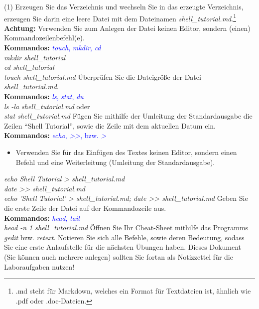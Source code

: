 \documentclass[paper=a4,fontsize=11pt]{scrartcl}%
\numberwithin{equation}{section}
\begin{document}
\begin{enumerate}
        \begin{tasks}(1)
        \task Erzeugen Sie das Verzeichnis  und wechseln Sie in das erzeugte Verzeichnis, erzeugen Sie darin eine leere Datei mit dem Dateinamen \textit{shell\_tutorial.md}.\footnote{.md steht für Markdown, welches ein Format für Textdateien ist, ähnlich wie .pdf oder .doc-Dateien.} \\
        \textbf{Achtung:} Verwenden Sie zum Anlegen der Datei keinen Editor, sondern (einen) Kommandozeilenbefehl(e).\\
        \textbf{Kommandos:} \textcolor{blue}{\emph{touch}, \emph{mkdir}, \emph{cd}}\\
		\textit{mkdir shell\_tutorial}\\
		\textit{cd shell\_tutorial}\\
		\textit{touch shell\_tutorial.md}
		\task Überprüfen Sie die Dateigröße der Datei \textit{shell\_tutorial.md}.\\
		\textbf{Kommandos:} \textcolor{blue}{\emph{ls}, \emph{stat}, \emph{du}}\\
		\textit{ls -la shell\_tutorial.md} oder\\
		\textit{stat shell\_tutorial.md}
		\task Fügen Sie mithilfe der Umleitung der Standardausgabe die Zeilen  \enquote{Shell Tutorial}, sowie die Zeile mit dem aktuellen Datum ein.\\
		\textbf{Kommandos:} \textcolor{blue}{\emph{echo}, \emph{>>}, bzw. \emph{>}}\\
		\begin{itemize}
			\item \small Verwenden Sie für das Einfügen des Textes keinen Editor, sondern einen Befehl und eine Weiterleitung (Umleitung der Standardausgabe).
		\end{itemize}
		\textit{echo Shell Tutorial > shell\_tutorial.md}\\
		\textit{date >> shell\_tutorial.md}\\
		\textit{echo 'Shell Tutorial' > shell\_tutorial.md; date >> shell\_tutorial.md}
		\task Geben Sie die erste Zeile der Datei auf der Kommandozeile aus.\\
		\textbf{Kommandos:} \textcolor{blue}{\emph{head}, \emph{tail}}\\
		\textit{head -n 1 shell\_tutorial.md}
		\task Öffnen Sie Ihr Cheat-Sheet mithilfe das Programms \emph{gedit} bzw. \emph{retext}. Notieren Sie sich alle Befehle, sowie deren Bedeutung, sodass Sie eine erste Anlaufstelle für die nächsten Übungen haben. Dieses Dokument (Sie können auch mehrere anlegen) sollten Sie fortan als Notizzettel für die Laboraufgaben nutzen!

\end{tasks}
\end{enumerate}
\end{document}
